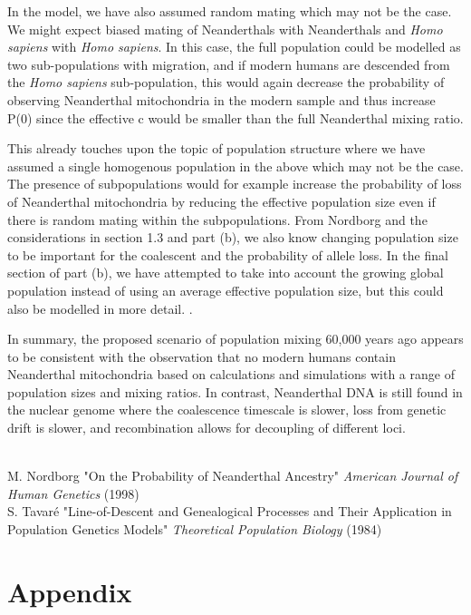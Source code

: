 \documentclass{article}
\begin{document}
In the model, we have also assumed random mating which may not be the case. We might expect biased mating of Neanderthals with Neanderthals and \textit{Homo sapiens} with \textit{Homo sapiens}. In this case, the full population could be modelled as two sub-populations with migration, and if modern humans are descended from the \textit{Homo sapiens} sub-population, this would again decrease the probability of observing Neanderthal mitochondria in the modern sample and thus increase P(0) since the effective c would be smaller than the full Neanderthal mixing ratio.

This already touches upon the topic of population structure where we have assumed a single homogenous population in the above which may not be the case. The presence of subpopulations would for example increase the probability of loss of Neanderthal mitochondria by reducing the effective population size even if there is random mating within the subpopulations. From Nordborg and the considerations in section 1.3 and part (b), we also know changing population size to be important for the coalescent and the probability of allele loss. In the final section of part (b), we have attempted to take into account the growing global population instead of using an average effective population size, but this could also be modelled in more detail. . 

In summary, the proposed scenario of population mixing 60,000 years ago appears to be consistent with the observation that no modern humans contain Neanderthal mitochondria based on calculations and simulations with a range of population sizes and mixing ratios.
In contrast, Neanderthal DNA is still found in the nuclear genome where the coalescence timescale is slower, loss from genetic drift is slower, and recombination allows for decoupling of different loci.

~\\

M. Nordborg "On  the Probability of Neanderthal Ancestry" \textit{American Journal of Human Genetics} (1998)\\
S. Tavaré "Line-of-Descent and Genealogical Processes and Their Application in Population Genetics Models" \textit{Theoretical Population Biology} (1984)\\

\newpage

\section*{Appendix}






\end{document}
